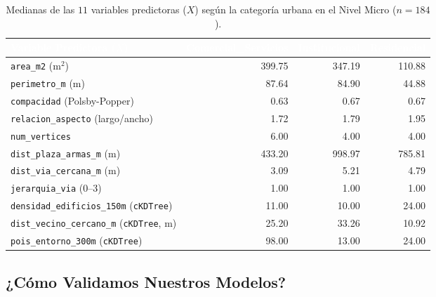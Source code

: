 \documentclass[11pt,a4paper]{article}
\begin{document}
\begin{table}[H]
    \centering
    \caption{Medianas de las $11$ variables predictoras ($X$) según la categoría urbana en el Nivel Micro ($n = 184$).}
    \label{tab:medianas_micro}
    \setlength{\tabcolsep}{6pt}
    \small
    \begin{adjustbox}{max width=\textwidth}
    \begin{tabular}{lrrr}
        \toprule
        \rowcolor{verdeHeader}
        \textcolor{white}{\textbf{Variable Predictora ($X$)}} & \textcolor{white}{\textbf{Comercial\_Servicios}} & \textcolor{white}{\textbf{Institucional}} & \textcolor{white}{\textbf{Residencial}} \\
        \midrule
        \texttt{area\_m2} ($\text{m}^2$) & 399.75 & 347.19 & 110.88 \\
        \rowcolor{verdeSuave!50}
        \texttt{perimetro\_m} (m) & 87.64 & 84.90 & 44.88 \\
        \texttt{compacidad} (Polsby-Popper) & 0.63 & 0.67 & 0.67 \\
        \rowcolor{verdeSuave!50}
        \texttt{relacion\_aspecto} (largo/ancho) & 1.72 & 1.79 & 1.95 \\
        \texttt{num\_vertices} & 6.00 & 4.00 & 4.00 \\
        \rowcolor{verdeSuave!50}
        \texttt{dist\_plaza\_armas\_m} (m) & 433.20 & 998.97 & 785.81 \\
        \texttt{dist\_via\_cercana\_m} (m) & 3.09 & 5.21 & 4.79 \\
        \rowcolor{verdeSuave!50}
        \texttt{jerarquia\_via} (0--3) & 1.00 & 1.00 & 1.00 \\
        \texttt{densidad\_edificios\_150m} (\texttt{cKDTree}) & 11.00 & 10.00 & 24.00 \\
        \rowcolor{verdeSuave!50}
        \texttt{dist\_vecino\_cercano\_m} (\texttt{cKDTree}, m) & 25.20 & 33.26 & 10.92 \\
        \texttt{pois\_entorno\_300m} (\texttt{cKDTree}) & 98.00 & 13.00 & 24.00 \\
        \bottomrule
    \end{tabular}
    \end{adjustbox}
\end{table}


\subsection{¿Cómo Validamos Nuestros Modelos?}
\end{document}
